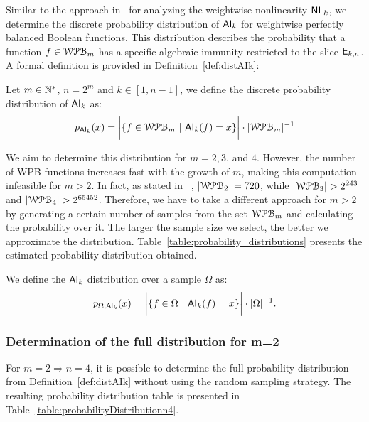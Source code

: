 \documentclass[11pt]{llncs}
\begin{document}
Similar to the approach in~\cite{Latin:GinMea23} for analyzing the weightwise nonlinearity $\mathsf{NL}_{k}$, we determine the discrete probability distribution of $\mathsf{AI}_{k}$ for weightwise perfectly balanced Boolean functions. 
This distribution describes the probability that a function $f \in \mathcal{WPB}_{m}$ has a specific algebraic immunity restricted to the slice $\mathsf{E}_{k,n}$. 
A formal definition is provided in Definition~\ref{def:distAIk}:

\begin{definition}\label{def:distAIk}
    Let $m \in \mathbb{N}^*$, $n = 2^m$ and $k \in [1,n-1]$, we define the discrete probability distribution of $\mathsf{AI}_{k}$ as:
\[p_{\mathsf{AI}_{k}}(x) = \bigg|\{f\in \mathcal{WPB}_{m}\  |\  \mathsf{AI}_{k}(f) = x\}\bigg| \cdot |\mathcal{WPB}_{m}|^{-1}\]
\end{definition}

We aim to determine this distribution for $m = 2, 3$, and $4$. 
However, the number of WPB functions increases fast with the growth of $m$, making this computation infeasible for $m > 2$. In fact, as stated in ~\cite{Latin:GinMea23}, $|\mathcal{WPB}_{2}| = 720$, while $|\mathcal{WPB}_{3}| > 2^{243}$ and $|\mathcal{WPB}_{4}| > 2^{65452}$.
Therefore, we have to take a different approach for $m > 2$ by generating a certain number of samples from the set $\mathcal{WPB}_{m}$ and calculating the probability over it. The larger the sample size we select, the better we approximate the distribution. 
Table~\ref{table:probability_distributions} presents the estimated probability distribution obtained.

\begin{definition}
    We define the $\mathsf{AI}_{k}$ distribution over a sample $\Omega$ as:
\[
 p_{\Omega,\mathsf{AI}_{k} }(x) =  \bigg|\{f\in \Omega\ | \  \mathsf{AI}_{k}(f) = x\}\bigg| \cdot |\Omega|^{-1}.\]
\end{definition}


\subsubsection{Determination of the full distribution for \texorpdfstring{m=2}{m=2}}
For $m=2 \Rightarrow n = 4$, it is possible to determine the full probability distribution from Definition~\ref{def:distAIk} without using the random sampling strategy. 
The resulting probability distribution table is presented in Table~\ref{table:probabilityDistributionn4}. 
\end{document}
